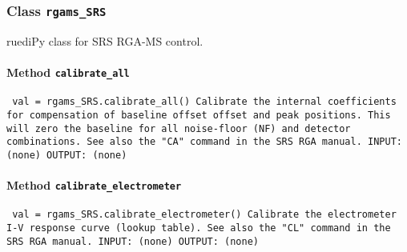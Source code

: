 
\subsubsection{Class \texttt{rgams_SRS}}
\par
ruediPy class for SRS RGA-MS control.\par

\paragraph{Method \texttt{calibrate_all}}
\vspace{1ex}
\texttt{\newline
val = rgams_SRS.calibrate_all()\newline
\newline
Calibrate the internal coefficients for compensation of baseline offset offset and peak positions. This will zero the baseline for all noise-floor (NF) and detector combinations. See also the "CA" command in the SRS RGA manual.\newline
\newline
INPUT:\newline
(none)\newline
\newline
OUTPUT:\newline
(none)\newline
\newline
}

\paragraph{Method \texttt{calibrate_electrometer}}
\vspace{1ex}
\texttt{\newline
val = rgams_SRS.calibrate_electrometer()\newline
\newline
Calibrate the electrometer I-V response curve (lookup table). See also the "CL" command in the SRS RGA manual.\newline
\newline
INPUT:\newline
(none)\newline
\newline
OUTPUT:\newline
(none)\newline
\newline
}

